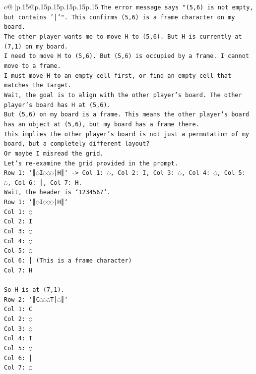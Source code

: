\documentclass{article}
\begin{document}
{\begin{supertabular}{c@{$\;$}|p{.15\linewidth}@{}p{.15\linewidth}p{.15\linewidth}p{.15\linewidth}p{.15\linewidth}p{.15\linewidth}}
{{{\texttt{The error message says "(5,6) is not empty, but contains '│'". This confirms (5,6) is a frame character on my board.} \\
\texttt{The other player wants me to move H to (5,6). But H is currently at (7,1) on my board.} \\
\texttt{I need to move H to (5,6). But (5,6) is occupied by a frame. I cannot move to a frame.} \\
\texttt{I must move H to an empty cell first, or find an empty cell that matches the target.} \\
\texttt{Wait, the goal is to align with the other player's board. The other player's board has H at (5,6).} \\
\texttt{But (5,6) on my board is a frame. This means the other player's board has an object at (5,6), but my board has a frame there.} \\
\texttt{This implies the other player's board is not just a permutation of my board, but a completely different layout?} \\
\texttt{Or maybe I misread the grid.} \\
\texttt{Let's re{-}examine the grid provided in the prompt.} \\
\texttt{Row 1: `║◌I◌◌◌│H║` {-}> Col 1: ◌, Col 2: I, Col 3: ◌, Col 4: ◌, Col 5: ◌, Col 6: │, Col 7: H.} \\
\texttt{Wait, the header is `1234567`.} \\
\texttt{Row 1: `║◌I◌◌◌│H║`} \\
\texttt{Col 1: ◌} \\
\texttt{Col 2: I} \\
\texttt{Col 3: ◌} \\
\texttt{Col 4: ◌} \\
\texttt{Col 5: ◌} \\
\texttt{Col 6: │ (This is a frame character)} \\
\texttt{Col 7: H} \\
\\ 
\texttt{So H is at (7,1).} \\
\texttt{Row 2: `║C◌◌◌T│◌║`} \\
\texttt{Col 1: C} \\
\texttt{Col 2: ◌} \\
\texttt{Col 3: ◌} \\
\texttt{Col 4: T} \\
\texttt{Col 5: ◌} \\
\texttt{Col 6: │} \\
\texttt{Col 7: ◌} \\
}}}
\end{supertabular}}
\end{document}
